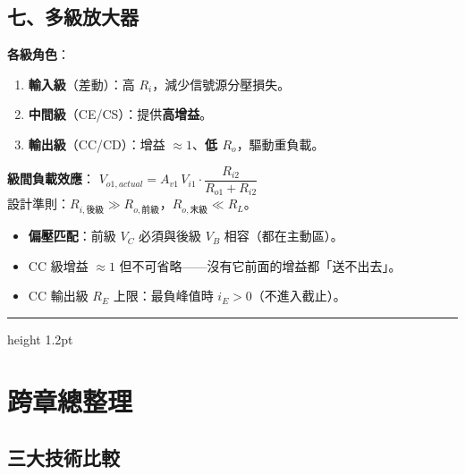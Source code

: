 \documentclass[10pt]{article}
\begin{document}
\subsection*{七、多級放大器}

\textbf{各級角色}：
\begin{enumerate}[leftmargin=2em,itemsep=0pt,topsep=1pt]
\item \textbf{輸入級}（差動）：高 $R_i$，減少信號源分壓損失。
\item \textbf{中間級}（CE/CS）：提供\textbf{高增益}。
\item \textbf{輸出級}（CC/CD）：增益 $\approx1$、\textbf{低 $R_o$}，驅動重負載。
\end{enumerate}

\begin{formulabox}
\textbf{級間負載效應}：\quad
$V_{o1,actual} = A_{v1}\,V_{i1}\cdot\dfrac{R_{i2}}{R_{o1}+R_{i2}}$\\[5pt]
設計準則：$R_{i,\text{後級}} \gg R_{o,\text{前級}}$，$R_{o,\text{末級}} \ll R_L$。
\end{formulabox}

\begin{trapbox}[多級設計陷阱]
\begin{itemize}[leftmargin=1.8em,itemsep=0pt,topsep=1pt]
\item \textbf{偏壓匹配}：前級 $V_C$ 必須與後級 $V_B$ 相容（都在主動區）。
\item CC 級增益 $\approx 1$ 但不可省略——沒有它前面的增益都「送不出去」。
\item CC 輸出級 $R_E$ 上限：最負峰值時 $i_E > 0$（不進入截止）。
\end{itemize}
\end{trapbox}

\bigskip\hrule height 1.2pt\bigskip

\section*{\color{maincol} 跨章總整理}

\subsection*{三大技術比較}
\end{document}

